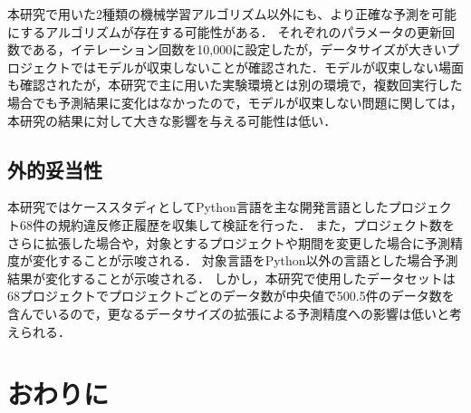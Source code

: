\documentclass[submit,noauthor,ses,dvipdfmx]{ipsj}
\begin{document}
本研究で用いた2種類の機械学習アルゴリズム以外にも、より正確な予測を可能にするアルゴリズムが存在する可能性がある．
それぞれのパラメータの更新回数である，イテレーション回数を10,000に設定したが，データサイズが大きいプロジェクトではモデルが収束しないことが確認された．モデルが収束しない場面も確認されたが，本研究で主に用いた実験環境とは別の環境で，複数回実行した場合でも予測結果に変化はなかったので，モデルが収束しない問題に関しては，本研究の結果に対して大きな影響を与える可能性は低い．


\subsection{外的妥当性}

本研究ではケーススタディとしてPython言語を主な開発言語としたプロジェクト68件の規約違反修正履歴を収集して検証を行った．
また，プロジェクト数をさらに拡張した場合や，対象とするプロジェクトや期間を変更した場合に予測精度が変化することが示唆される．
対象言語をPython以外の言語とした場合予測結果が変化することが示唆される．
しかし，本研究で使用したデータセットは68プロジェクトでプロジェクトごとのデータ数が中央値で500.5件のデータ数を含んでいるので，更なるデータサイズの拡張による予測精度への影響は低いと考えられる．

\section{おわりに}\label{chap:end}
\end{document}
